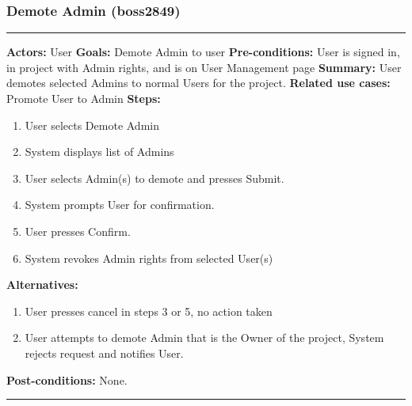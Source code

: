 \documentclass[11pt]{report}
\begin{document}
\subsubsection{Demote Admin  (boss2849)}
\vspace{2pt}
\hrule
\vspace{8pt}
 \textbf{Actors:} User \newline
\textbf{Goals:} Demote Admin to user \newline
 \textbf{Pre-conditions:} User is signed in, in project with Admin rights, and is on User Management page \newline
 \textbf{Summary:} User demotes selected Admins to normal Users for the project. \newline
\textbf{Related use cases:} Promote User to Admin \newline
\textbf{Steps:} \begin{enumerate}
  \item User selects Demote Admin
  \item System displays list of Admins
  \item User selects Admin(s) to demote and presses Submit.
  \item System prompts User for confirmation.
  \item User presses Confirm.
  \item System revokes Admin rights from selected User(s)
 \end{enumerate}
 \textbf{Alternatives:} \begin{enumerate}
  \item User presses cancel in steps 3 or 5, no action taken
  \item User attempts to demote Admin that is the Owner of the project, System rejects request and notifies User.
 \end{enumerate}
 \textbf{Post-conditions:} None. \newline
\vspace{8pt}
\hrule
\newpage
\end{document}
